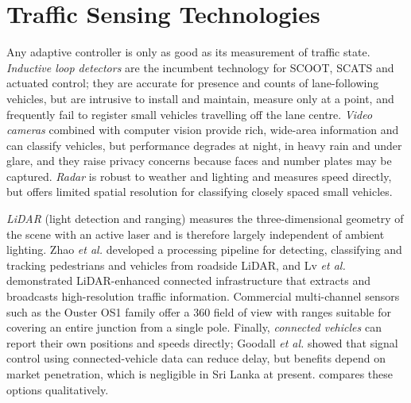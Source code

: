 \section{Traffic Sensing Technologies}\label{sec:lit-sensing}
Any adaptive controller is only as good as its measurement of traffic state. \emph{Inductive loop detectors}
are the incumbent technology for SCOOT, SCATS and actuated control; they are accurate for presence and counts of
lane-following vehicles, but are intrusive to install and maintain, measure only at a point, and frequently
fail to register small vehicles travelling off the lane centre. \emph{Video cameras} combined with computer
vision provide rich, wide-area information and can classify vehicles, but performance degrades at night, in
heavy rain and under glare, and they raise privacy concerns because faces and number plates may be captured.
\emph{Radar} is robust to weather and lighting and measures speed directly, but offers limited spatial
resolution for classifying closely spaced small vehicles.

\emph{LiDAR} (light detection and ranging) measures the three-dimensional geometry of the scene with an active
laser and is therefore largely independent of ambient lighting. Zhao \emph{et al.} \cite{zhao2019lidar} developed
a processing pipeline for detecting, classifying and tracking pedestrians and vehicles from roadside LiDAR, and
Lv \emph{et al.} \cite{lv2019lidar} demonstrated LiDAR-enhanced connected infrastructure that extracts and
broadcasts high-resolution traffic information. Commercial multi-channel sensors such as the Ouster OS1 family
\cite{ouster_os1} offer a 360\textdegree{} field of view with ranges suitable for covering an entire junction from a
single pole. Finally, \emph{connected vehicles} can report their own positions and speeds directly; Goodall
\emph{et al.} \cite{goodall2013cv} showed that signal control using connected-vehicle data can reduce delay, but
benefits depend on market penetration, which is negligible in Sri Lanka at present. 
compares these options qualitatively.

